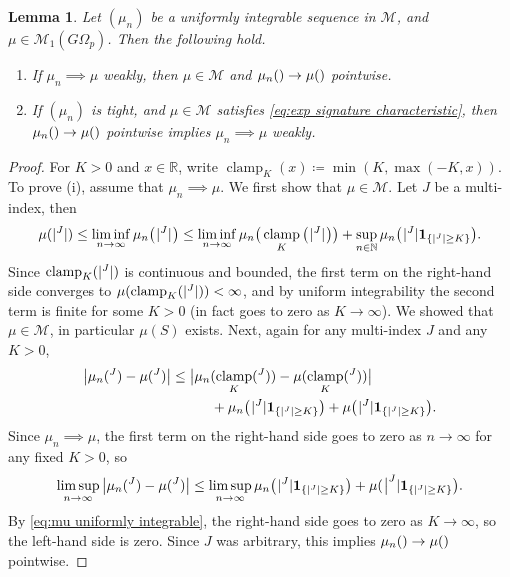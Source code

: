 \documentclass[11pt, letterpaper]{article}
\let\sig\relax
\DeclareMathOperator{\sig}{S}
\newtheorem{lemma}{Lemma}
\theoremstyle{definition}
\theoremstyle{remark}
\newcommand{\R}{\mathbb{R}}
\newcommand{\m}{\hspace{0.25mm}}
\newcommand{\mmm}{\hspace{10mm}}
\newcommand{\N}{\mathbb{N}}
\newcommand{\ind}{\boldsymbol{1}}
\DeclareMathOperator{\clamp}{clamp}
\begin{document}
\begin{appendices}
\begin{lemma}\label{lem:roughpaths}
    Let $(\mu_n)$ be a uniformly integrable sequence in $\mathcal{M}$, and $\mu \in \mathcal{M}_1(G\Omega_p)$.
    Then the following hold.
    \begin{enumerate}
        \item[(i)] If $\mu_n \implies \mu$ weakly, then $\mu \in \mathcal{M}$ and $\mu_n(\sig) \to \mu(\sig)$ pointwise.\medbreak
        \item[(ii)] If $(\mu_n)$ is tight, and $\mu\in \mathcal{M}$ satisfies \eqref{eq:exp signature characteristic}, then $\mu_n(\sig) \to \mu(\sig)$ pointwise implies $\mu_n \implies \mu$ weakly.
    \end{enumerate}
\end{lemma}
\begin{proof}
    For $K > 0$ and $x\in \R$, write $\clamp_K(x) \coloneqq \min(K,\max(-K,x))$. To prove (i), assume that $\mu_n \implies \mu$. We first show that $\mu \in \mathcal{M}$. Let $J$ be a multi-index, then
    \begin{align*}
        \mu(|\sig^J|) 
        \le \liminf_{n\to \infty} \mu_n\big(\m|\sig^J|\m\big)
        \le \liminf_{n\to \infty} \mu_n\big(\clamp_K\big(\m|\sig^J|\m\big)\big) + \sup_{n\in\N} \mu_n\big(\m|\sig^J| \ind_{\{|\sig^J| \ge K\}}\big).
    \end{align*}
    Since $\clamp_K(|\sig^J|)$ is continuous and bounded, the first term on the right-hand side converges to $\mu(\clamp_K(|\sig^J|)) < \infty$, and by uniform integrability the second term is finite for some $K > 0$ (in fact goes to zero as $K \to \infty$). We showed that $\mu \in \mathcal{M}$, in particular $\mu(S)$ exists. Next, again for any multi-index $J$ and any $K>0$,
    \begin{align*}
        \big| \mu_n(\sig^J) - \mu(\sig^J)\big|
        & \le \big| \mu_n(\clamp_K(\sig^J)) - \mu(\clamp_K(\sig^J))\big| \\
        &\mmm + \mu_n\big(\m|\sig^J| \ind_{\{|\sig^J| \ge K\}}\big) + \mu\big(\m|\sig^J| \ind_{\{|\sig^J| \ge K\}}\big).
    \end{align*}
    Since $\mu_n \implies \mu$, the first term on the right-hand side goes to zero as $n\to \infty$ for any fixed $K > 0$, so
    \begin{align*}
        \limsup_{n\to \infty}\big| \mu_n(\sig^J) - \mu(\sig^J)\big|
        \le \limsup_{n\to \infty} \mu_n\big(\m|\sig^J| \ind_{\{|\sig^J| \ge K\}}\big) + \mu(\m\big|\sig^J| \ind_{\{|\sig^J| \ge K\}}\big).
    \end{align*}
    By \eqref{eq:mu uniformly integrable}, the right-hand side goes to zero as $K \to \infty$, so the left-hand side is zero. Since $J$ was arbitrary, this implies $\mu_n(\sig) \to \mu(\sig)$ pointwise.


\end{proof}
\end{appendices}
\end{document}
